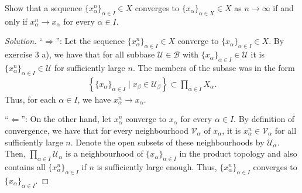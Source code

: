 \documentclass[a4paper]{article}
\theoremstyle{definition}
\begin{document}
Show that a sequence \(\{x_\alpha^n\}_{\alpha \in I} \in X\) converges to \(\{x_\alpha\}_{\alpha \in X} \in X\) as \(n \longrightarrow \infty\) if and only if \(x^n_\alpha \longrightarrow x_\alpha\) for every \(\alpha \in I\).

\begin{proof}[Solution]
    ``\(\Rightarrow\)'': Let the sequence \(\{x_\alpha^n\}_{\alpha \in I} \in X\) converge to \(\{x_\alpha\}_{\alpha \in I} \in X\). By exercise 3 a), we have that for all subbase \(\mathcal{U} \in \mathcal{B}\) with \(\{x_\alpha\}_{\alpha \in I} \in \mathcal{U}\) it is \(\{x_\alpha^n\}_{\alpha \in I} \in \mathcal{U}\) for sufficiently large \(n\). The members of the subase was in the form
    \begin{align*}
        \left\{ \{x_\alpha\}_{\alpha \in I} \mid x_\beta \in \mathcal{U}_\beta \right\} \subset \prod_{\alpha \in I} X_\alpha \text{.}
    \end{align*}
    Thus, for each \(\alpha \in I\), we have \(x^n_\alpha \rightarrow x_\alpha\).

    ``\(\Leftarrow\)'': On the other hand, let \(x^n_\alpha\) converge to \(x_\alpha\) for every \(\alpha \in I\). By definition of convergence, we have that for every neighbourhood \(\mathcal{V}_\alpha\) of \(x_\alpha\), it is \(x^n_\alpha \in \mathcal{V}_\alpha\) for all sufficiently large \(n\). Denote the open subsets of these neighbourhoods by \(\mathcal{U}_\alpha\). Then, \(\prod_{\alpha \in I} \mathcal{U}_\alpha\) is a neighbourhood of \(\{x_\alpha\}_{\alpha \in I}\) in the product topology and also contains all \(\{x_\alpha^n\}_{\alpha \in I}\) if \(n\) is sufficiently large enough. Thus, \(\{x_\alpha^n\}_{\alpha \in I}\) converges to \(\{x_\alpha\}_{\alpha \in I}\).
\end{proof}
\end{document}
